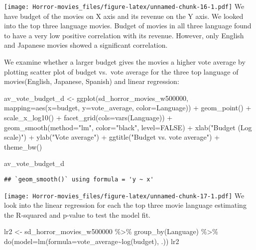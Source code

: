 \documentclass[
]{article}
\newenvironment{Shaded}{\begin{snugshade}}{\end{snugshade}}
\newcommand{\AttributeTok}[1]{\textcolor[rgb]{0.77,0.63,0.00}{#1}}
\newcommand{\ConstantTok}[1]{\textcolor[rgb]{0.00,0.00,0.00}{#1}}
\newcommand{\FunctionTok}[1]{\textcolor[rgb]{0.00,0.00,0.00}{#1}}
\newcommand{\NormalTok}[1]{#1}
\newcommand{\OtherTok}[1]{\textcolor[rgb]{0.56,0.35,0.01}{#1}}
\newcommand{\SpecialCharTok}[1]{\textcolor[rgb]{0.00,0.00,0.00}{#1}}
\newcommand{\StringTok}[1]{\textcolor[rgb]{0.31,0.60,0.02}{#1}}
\begin{document}
\texttt{[image: Horror-movies\_files/figure-latex/unnamed-chunk-16-1.pdf]}
We have budget of the movies on X axis and its revenue on the Y axis. We
looked into the top three language movies. Budget of movies in all three
language found to have a very low positive correlation with its revenue.
However, only English and Japanese movies showed a significant
correlation.

We examine whether a larger budget gives the movies a higher vote
average by plotting scatter plot of budget vs.~vote average for the
three top language of movies(English, Japanese, Spanish) and linear
regression:

\begin{Shaded}
\begin{Highlighting}[]
\NormalTok{av\_vote\_budget\_d }\OtherTok{\textless{}{-}} \FunctionTok{ggplot}\NormalTok{(sd\_horror\_movies\_w500000, }\AttributeTok{mapping=}\FunctionTok{aes}\NormalTok{(}\AttributeTok{x=}\NormalTok{budget, }\AttributeTok{y=}\NormalTok{vote\_average, }\AttributeTok{color=}\NormalTok{Language)) }\SpecialCharTok{+} \FunctionTok{geom\_point}\NormalTok{() }\SpecialCharTok{+} \FunctionTok{scale\_x\_log10}\NormalTok{() }\SpecialCharTok{+} \FunctionTok{facet\_grid}\NormalTok{(}\AttributeTok{cols=}\FunctionTok{vars}\NormalTok{(Language)) }\SpecialCharTok{+} \FunctionTok{geom\_smooth}\NormalTok{(}\AttributeTok{method=}\StringTok{"lm"}\NormalTok{, }\AttributeTok{color=}\StringTok{"black"}\NormalTok{, }\AttributeTok{level=}\ConstantTok{FALSE}\NormalTok{) }\SpecialCharTok{+} \FunctionTok{xlab}\NormalTok{(}\StringTok{"Budget (Log scale)"}\NormalTok{) }\SpecialCharTok{+} \FunctionTok{ylab}\NormalTok{(}\StringTok{"Vote average"}\NormalTok{) }\SpecialCharTok{+} \FunctionTok{ggtitle}\NormalTok{(}\StringTok{"Budget vs. vote average"}\NormalTok{) }\SpecialCharTok{+} \FunctionTok{theme\_bw}\NormalTok{() }

\NormalTok{av\_vote\_budget\_d}
\end{Highlighting}
\end{Shaded}

\begin{verbatim}
## `geom_smooth()` using formula = 'y ~ x'
\end{verbatim}

\texttt{[image: Horror-movies\_files/figure-latex/unnamed-chunk-17-1.pdf]}
We look into the linear regression for each the top three movie language
estimating the R-squared and p-value to test the model fit.

\begin{Shaded}
\begin{Highlighting}[]
\NormalTok{lr2 }\OtherTok{\textless{}{-}}\NormalTok{ sd\_horror\_movies\_w500000 }\SpecialCharTok{\%\textgreater{}\%} \FunctionTok{group\_by}\NormalTok{(Language) }\SpecialCharTok{\%\textgreater{}\%} \FunctionTok{do}\NormalTok{(}\AttributeTok{model=}\FunctionTok{lm}\NormalTok{(}\AttributeTok{formula=}\NormalTok{vote\_average}\SpecialCharTok{\textasciitilde{}}\FunctionTok{log}\NormalTok{(budget), .))}
\NormalTok{lr2}
\end{Highlighting}
\end{Shaded}
\end{document}
